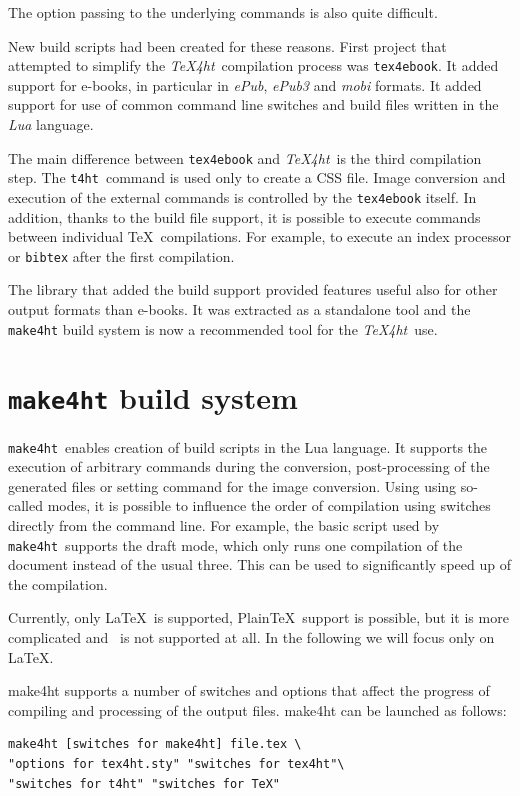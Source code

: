 \documentclass{ltugproc}
\newcommand\term[1]{\textit{#1}}
\newcommand\command[1]{\texttt{#1}}
\newcommand\texfourht{\term{\TeX4ht}}
\newcommand\tfourhtcmd{\command{t4ht}}
\newcommand\makefourht{\command{make4ht}}
\begin{document}
The option passing to the underlying commands is also quite difficult.

New build scripts had been created for these reasons. First project that
attempted to simplify the \texfourht\ compilation process was
\command{tex4ebook}. It added support for e-books, in particular in
\term{ePub}, \term{ePub3} and \term{mobi} formats. It added support for use of
common command line switches and build files written in the \term{Lua} language.

The main difference between \command{tex4ebook} and \texfourht\ is the third compilation
step. The \tfourhtcmd\ command is used only to create a CSS file. 
Image conversion and execution of the external commands is controlled by the
\command{tex4ebook} itself. In addition, thanks to the build file support, it
is possible to execute commands between individual \TeX\ compilations. For
example, to execute an index processor or \command{bibtex}
after the first compilation.

The library that added the build support provided 
features useful also for other output formats than e-books. It
was extracted as a standalone tool and the \command{make4ht} build system is now a
recommended tool for the \texfourht\ use.


\section{\command{make4ht} build system}

\makefourht\ enables creation of build scripts in the Lua language. 
It supports the execution of arbitrary commands during the conversion,
post-processing of the generated files or setting command for the image
conversion.
Using using so-called modes, it is possible to 
influence the order of compilation using switches directly from the   command
line. For example, the basic script used by \makefourht\ supports the draft mode, which
only runs one compilation of the document instead of the usual three. This can
be used to significantly  speed up of the  compilation. 

Currently, only \LaTeX\ is supported, Plain\TeX\ support  is possible, but it is
more complicated and \ConTeXt\ is not supported at all. In the following we
will focus only on \LaTeX.

make4ht supports a number of switches and options that affect the progress of compiling and processing of the output files.
make4ht can be launched as follows:

\bgroup\small
\begin{verbatim}
make4ht [switches for make4ht] file.tex \
"options for tex4ht.sty" "switches for tex4ht"\
"switches for t4ht" "switches for TeX" 
\end{verbatim}
\egroup
\end{document}
